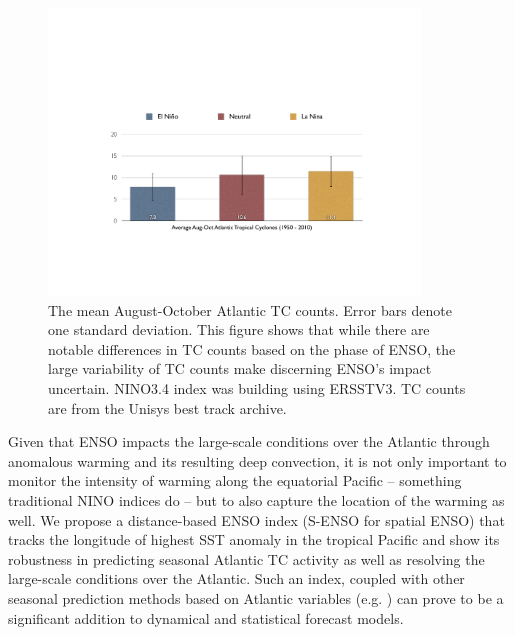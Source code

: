  





\begin{figure}[htbp]
	\centering
		\includegraphics[height=3in]{figures/nino_tc_bars.pdf}
	\caption{The mean August-October Atlantic TC counts. Error bars denote one standard deviation. This figure shows that while there are notable differences in TC counts based on the phase of ENSO, the large variability of TC counts make discerning ENSO's impact uncertain. NINO3.4 index was building using ERSSTV3. TC counts are from the Unisys best track archive.}
	\label{fig:figures_nino_tc_bars}
\end{figure}

Given that ENSO impacts the large-scale conditions over the Atlantic through anomalous warming and its resulting deep convection, it is not only important to monitor the intensity of warming along the equatorial Pacific -- something traditional NINO indices do -- but to also capture the location of the warming as well. We propose a distance-based ENSO index (S-ENSO for spatial ENSO) that tracks the longitude of highest SST anomaly in the tropical Pacific and show its robustness in predicting seasonal Atlantic TC activity as well as resolving the large-scale conditions over the Atlantic. Such an index, coupled with other seasonal prediction methods based on Atlantic variables (e.g. \cite{knutson2007, emanuel2008simulation}) can prove to be a significant addition to dynamical and statistical forecast models.

